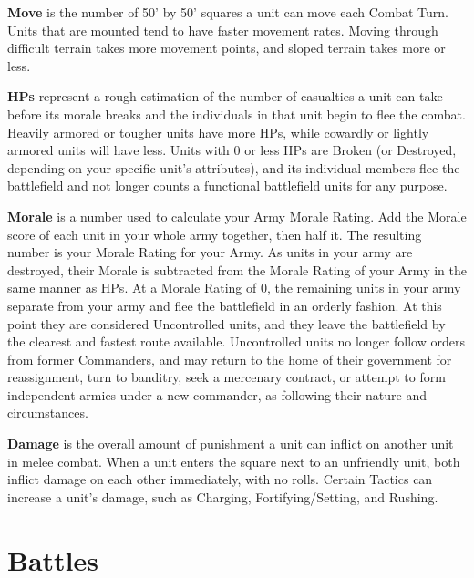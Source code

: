 \begin{list}{}{\itemspace}
\item\textbf{Move} is the number of 50' by 50' squares a unit can move each Combat Turn. Units that are mounted tend to have faster movement rates. Moving through difficult terrain takes more movement points, and sloped terrain takes more or less.
\vspace{10pt}

\item\textbf{HPs} represent a rough estimation of the number of casualties a unit can take before its morale breaks and the individuals in that unit begin to flee the combat. Heavily armored or tougher units have more HPs, while cowardly or lightly armored units will have less. Units with 0 or less HPs are Broken (or Destroyed, depending on your specific unit's attributes), and its individual members flee the battlefield and not longer counts a functional battlefield units for any purpose.
\vspace{10pt}

\item\textbf{Morale} is a number used to calculate your Army Morale Rating. Add the Morale score of each unit in your whole army together, then half it. The resulting number is your Morale Rating for your Army. As units in your army are destroyed, their Morale is subtracted from the Morale Rating of your Army in the same manner as HPs. At a Morale Rating of 0, the remaining units in your army separate from your army and flee the battlefield in an orderly fashion. At this point they are considered Uncontrolled units, and they leave the battlefield by the clearest and fastest route available. Uncontrolled units no longer follow orders from former Commanders, and may return to the home of their government for reassignment, turn to banditry, seek a mercenary contract, or attempt to form independent armies under a new commander, as following their nature and circumstances.
\vspace{10pt}

\item\textbf{Damage} is the overall amount of punishment a unit can inflict on another unit in melee combat. When a unit enters the square next to an unfriendly unit, both inflict damage on each other immediately, with no rolls. Certain Tactics can increase a unit's damage, such as Charging, Fortifying/Setting, and Rushing.
\end{list}

\section{Battles}

